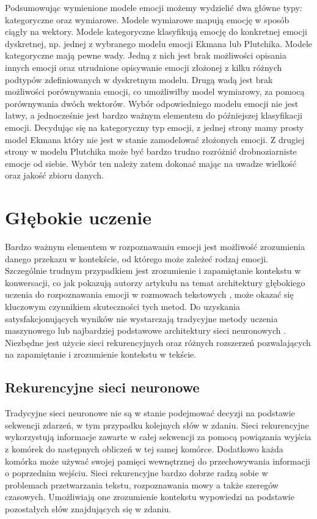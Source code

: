 Podsumowując wymienione modele emocji możemy wydzielić dwa główne typy: kategoryczne oraz wymiarowe. Modele wymiarowe mapują emocję w sposób ciągły na wektory. Modele kategoryczne klasyfikują emocję do konkretnej emocji dyskretnej, np. jednej z wybranego modelu emocji Ekmana lub Plutchika. Modele kategoryczne mają pewne wady. Jedną z nich jest brak możliwości opisania innych emocji oraz utrudnione opisywanie emocji złożonej z kilku różnych podtypów zdefiniowanych w dyskretnym modelu. Drugą wadą jest brak możliwości porównywania emocji, co umożliwiłby model wymiarowy, za pomocą porównywania dwóch wektorów. Wybór odpowiedniego modelu emocji nie jest łatwy, a jednocześnie jest bardzo ważnym elementem do późniejszej klasyfikacji emocji. Decydując się na kategoryczny typ emocji, z jednej strony mamy prosty model Ekmana który nie jest w stanie zamodelować złożonych emocji. Z drugiej strony w modelu Plutchika może być bardzo trudno rozróżnić drobnoziarniste emocje od siebie. Wybór ten należy zatem dokonać mając na uwadze wielkość oraz jakość zbioru danych.

\section{Głębokie uczenie}

Bardzo ważnym elementem w rozpoznawaniu emocji jest możliwość zrozumienia danego przekazu w kontekście, od którego może zależeć rodzaj emocji. Szczególnie trudnym przypadkiem jest zrozumienie i zapamiętanie kontekstu w konwersacji, co jak pokazują autorzy artykułu na temat architektury głębokiego uczenia do rozpoznawania emocji w rozmowach tekstowych \cite{zhong2019knowledgeenriched}, może okazać się kluczowym czynnikiem skuteczności tych metod. Do uzyskania satysfakcjonujących wyników nie wystarczają tradycyjne metody uczenia maszynowego lub najbardziej podstawowe architektury sieci neuronowych \cite{kowsari2019text}. Niezbędne jest użycie sieci rekurencyjnych oraz różnych rozszerzeń pozwalających na zapamiętanie i zrozumienie kontekstu w tekście.

\subsection{Rekurencyjne sieci neuronowe}

Tradycyjne sieci neuronowe nie są w stanie podejmować decyzji na podstawie sekwencji zdarzeń, w tym przypadku kolejnych słów w zdaniu. Sieci rekurencyjne wykorzystują informacje zawarte w całej sekwencji za pomocą powiązania wyjścia z komórek do następnych obliczeń w tej samej komórce. Dodatkowo każda komórka może używać swojej pamięci wewnętrznej do przechowywania informacji o poprzednim wejściu. Sieci rekurencyjne bardzo dobrze radzą sobie w problemach przetwarzania tekstu, rozpoznawania mowy a także szeregów czasowych. Umożliwiają one zrozumienie kontekstu wypowiedzi na podstawie pozostałych słów znajdujących się w zdaniu.

